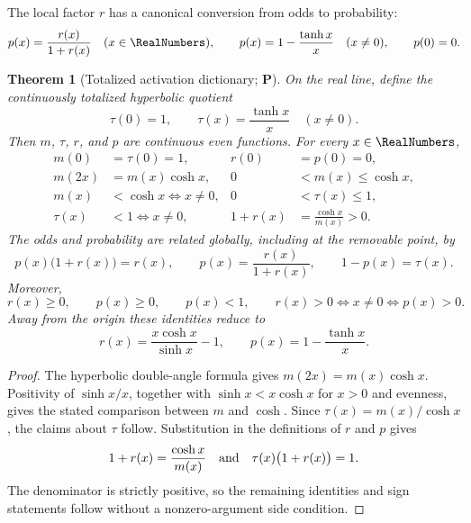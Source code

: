\documentclass[11pt,oneside]{article}
\newtheorem{theorem}{Theorem}[section]
\theoremstyle{definition}
\theoremstyle{remark}
\newcommand{\statusP}{\textcolor{deepgreen}{\textbf{P}}}
\begin{document}
The local factor $r$ has a canonical conversion from odds to probability:
\begin{equation}
 p(x)=\frac{r(x)}{1+r(x)}
 \quad(x\in\RealNumbers),
 \qquad
 p(x)=1-\frac{\tanh x}{x}\quad(x\ne0),
 \qquad p(0)=0.
 \label{eq:p-local}
\end{equation}

\begin{theorem}[Totalized activation dictionary; \statusP]
\label{thm:totalized-activation-dictionary}
On the real line, define the continuously totalized hyperbolic quotient
\[
 \tau(0)=1,
 \qquad
 \tau(x)=\frac{\tanh x}{x}\quad(x\ne0).
\]
Then $m$, $\tau$, $r$, and $p$ are continuous even functions.  For every
$x\in\RealNumbers$,
\begin{align}
 m(0)&=\tau(0)=1,
 &r(0)&=p(0)=0,
 \label{eq:totalized-activation-origin}\\
 m(2x)&=m(x)\cosh x,
 &0&<m(x)\le\cosh x,
 \label{eq:totalized-sinhc-double}\\
 m(x)&<\cosh x\iff x\ne0,
 &0&<\tau(x)\le1,
 \label{eq:totalized-sinhc-order}\\
 \tau(x)&<1\iff x\ne0,
 &1+r(x)&=\frac{\cosh x}{m(x)}>0.
 \label{eq:totalized-tanhdiv-order}
\end{align}
The odds and probability are related globally, including at the removable
point, by
\begin{equation}
 p(x)\bigl(1+r(x)\bigr)=r(x),
 \qquad
 p(x)=\frac{r(x)}{1+r(x)},
 \qquad
 1-p(x)=\tau(x).
 \label{eq:totalized-odds-probability}
\end{equation}
Moreover,
\begin{equation}
 r(x)\ge0,\qquad
 p(x)\ge0,\qquad
 p(x)<1,
 \qquad
 r(x)>0\iff x\ne0\iff p(x)>0.
 \label{eq:totalized-activation-signs}
\end{equation}
Away from the origin these identities reduce to
\[
 r(x)=\frac{x\cosh x}{\sinh x}-1,
 \qquad
 p(x)=1-\frac{\tanh x}{x}.
\]
\end{theorem}

\begin{proof}
The hyperbolic double-angle formula gives $m(2x)=m(x)\cosh x$.
Positivity of $\sinh x/x$, together with
$\sinh x<x\cosh x$ for $x>0$ and evenness, gives the stated comparison
between $m$ and $\cosh$.  Since $\tau(x)=m(x)/\cosh x$, the claims about
$\tau$ follow.  Substitution in the definitions of $r$ and $p$ gives
\[
 1+r(x)=\frac{\cosh x}{m(x)}
 \quad\hbox{and}\quad
 \tau(x)\bigl(1+r(x)\bigr)=1.
\]
The denominator is strictly positive, so the remaining identities and sign
statements follow without a nonzero-argument side condition.
\end{proof}
\end{document}
